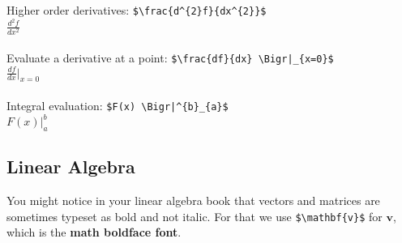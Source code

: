 \documentclass[12pt]{article}
\theoremstyle{definition}
\begin{document}
Higher order derivatives: \verb!$\frac{d^{2}f}{dx^{2}}$! \\ $\displaystyle \frac{d^{2}f}{dx^{2}}$\\   \\
Evaluate a derivative at a point:  \verb!$\frac{df}{dx} \Bigr|_{x=0}$! \\ $\displaystyle \frac{df}{dx} \Bigr|_{x=0}$\\   \\
Integral evaluation:  \verb!$F(x) \Bigr|^{b}_{a}$! \\ $\displaystyle F(x) \Bigr|^{b}_{a}$\\  

\subsection{Linear Algebra}
You might notice in your linear algebra book that vectors and matrices are sometimes typeset as bold and not italic.  For that we use \verb!$\mathbf{v}$! for $\mathbf{v}$, which is the \textbf{math boldface font}.\\ \\
\renewcommand{\arraystretch}{1.5} %
\end{document}

